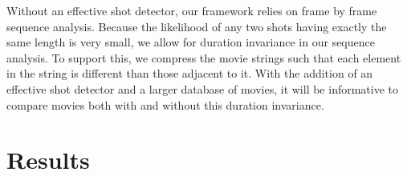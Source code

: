 Without an effective shot detector, our framework relies on frame by frame sequence analysis. Because the likelihood of any two shots having exactly the same length is very small, we allow for duration invariance in our sequence analysis. To support this, we compress the movie strings such that each element in the string is different than those adjacent to it. With the addition of an effective shot detector and a larger database of movies, it will be informative to compare movies both with and without this duration invariance.

\section*{Results}

